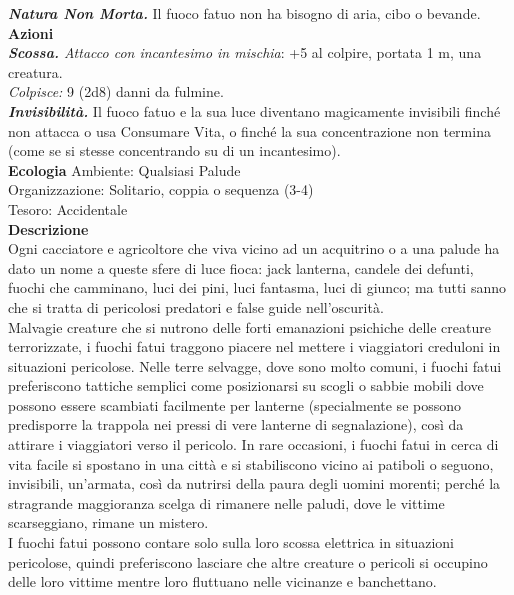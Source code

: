 \begin{multicols}{2}
\emph{\textbf{Natura Non Morta.}} Il fuoco fatuo non ha bisogno di aria, cibo o bevande.\\
\smallskip\textbf{Azioni}\\
\emph{\textbf{Scossa.} Attacco con incantesimo in mischia}: +5 al colpire, portata 1 m, una creatura.\\
\emph{Colpisce:} 9 (2d8) danni da fulmine.\\
\emph{\textbf{Invisibilità.}} Il fuoco fatuo e la sua luce diventano magicamente invisibili finché non attacca o usa Consumare Vita, o finché la sua concentrazione non termina (come se si stesse concentrando su di un incantesimo).\\
\textbf{Ecologia}
Ambiente: Qualsiasi Palude\\
Organizzazione: Solitario, coppia o sequenza (3-4)\\
Tesoro: Accidentale\\
\textbf{Descrizione}\\
Ogni cacciatore e agricoltore che viva vicino ad un acquitrino o a una palude ha dato un nome a queste sfere di luce fioca: jack lanterna, candele dei defunti, fuochi che camminano, luci dei pini, luci fantasma, luci di giunco; ma tutti sanno che si tratta di pericolosi predatori e false guide nell'oscurità.\\

Malvagie creature che si nutrono delle forti emanazioni psichiche delle creature terrorizzate, i fuochi fatui traggono piacere nel mettere i viaggiatori creduloni in situazioni pericolose. Nelle terre selvagge, dove sono molto comuni, i fuochi fatui preferiscono tattiche semplici come posizionarsi su scogli o sabbie mobili dove possono essere scambiati facilmente per lanterne (specialmente se possono predisporre la trappola nei pressi di vere lanterne di segnalazione), così da attirare i viaggiatori verso il pericolo. In rare occasioni, i fuochi fatui in cerca di vita facile si spostano in una città e si stabiliscono vicino ai patiboli o seguono, invisibili, un’armata, così da nutrirsi della paura degli uomini morenti; perché la stragrande maggioranza scelga di rimanere nelle paludi, dove le vittime scarseggiano, rimane un mistero.\\

I fuochi fatui possono contare solo sulla loro scossa elettrica in situazioni pericolose, quindi preferiscono lasciare che altre creature o pericoli si occupino delle loro vittime mentre loro fluttuano nelle vicinanze e banchettano.\\


\end{multicols}
